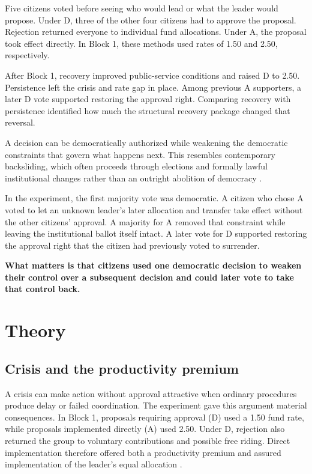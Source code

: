\documentclass[11pt]{article}
\newcommand{\Dproc}{\textsf{D}}
\newcommand{\Aproc}{\textsf{A}}
\begin{document}
\begin{plainlanguagebox}
Five citizens voted before seeing who would lead or what the leader would propose. Under \Dproc{}, three of the other four citizens had to approve the proposal. Rejection returned everyone to individual fund allocations. Under \Aproc{}, the proposal took effect directly. In Block 1, these methods used rates of 1.50 and 2.50, respectively.

After Block 1, recovery improved public-service conditions and raised \Dproc{} to 2.50. Persistence left the crisis and rate gap in place. Among previous \Aproc{} supporters, a later \Dproc{} vote supported restoring the approval right. Comparing recovery with persistence identified how much the structural recovery package changed that reversal.
\end{plainlanguagebox}

\begin{keyinsightbox}
A decision can be democratically authorized while weakening the democratic constraints that govern what happens next. This resembles contemporary backsliding, which often proceeds through elections and formally lawful institutional changes rather than an outright abolition of democracy \parencite{Bermeo2016}.

In the experiment, the first majority vote was democratic. A citizen who chose \Aproc{} voted to let an unknown leader's later allocation and transfer take effect without the other citizens' approval. A majority for \Aproc{} removed that constraint while leaving the institutional ballot itself intact. A later vote for \Dproc{} supported restoring the approval right that the citizen had previously voted to surrender.

\medskip
\textbf{What matters is that citizens used one democratic decision to weaken their control over a subsequent decision and could later vote to take that control back.}
\end{keyinsightbox}


\section{Theory}

\subsection{Crisis and the productivity premium}

A crisis can make action without approval attractive when ordinary procedures produce delay or failed coordination. The experiment gave this argument material consequences. In Block 1, proposals requiring approval (\Dproc) used a 1.50 fund rate, while proposals implemented directly (\Aproc) used 2.50. Under \Dproc{}, rejection also returned the group to voluntary contributions and possible free riding. Direct implementation therefore offered both a productivity premium and assured implementation of the leader's equal allocation \parencites{FehrGachter2000,FischbacherGachter2010,Hamman2011}.
\end{document}

